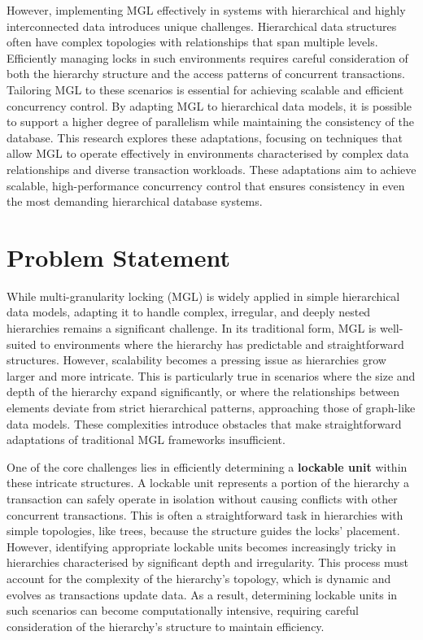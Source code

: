 However, implementing MGL effectively in systems with hierarchical and highly interconnected data introduces unique challenges. Hierarchical data structures often have complex topologies with relationships that span multiple levels. Efficiently managing locks in such environments requires careful consideration of both the hierarchy structure and the access patterns of concurrent transactions. Tailoring MGL to these scenarios is essential for achieving scalable and efficient concurrency control. By adapting MGL to hierarchical data models, it is possible to support a higher degree of parallelism while maintaining the consistency of the database. This research explores these adaptations, focusing on techniques that allow MGL to operate effectively in environments characterised by complex data relationships and diverse transaction workloads. These adaptations aim to achieve scalable, high-performance concurrency control that ensures consistency in even the most demanding hierarchical database systems.

\section*{Problem Statement}

While multi-granularity locking (MGL) is widely applied in simple hierarchical data models, adapting it to handle complex, irregular, and deeply nested hierarchies remains a significant challenge. In its traditional form, MGL is well-suited to environments where the hierarchy has predictable and straightforward structures. However, scalability becomes a pressing issue as hierarchies grow larger and more intricate. This is particularly true in scenarios where the size and depth of the hierarchy expand significantly, or where the relationships between elements deviate from strict hierarchical patterns, approaching those of graph-like data models. These complexities introduce obstacles that make straightforward adaptations of traditional MGL frameworks insufficient.

One of the core challenges lies in efficiently determining a \textbf{lockable unit} within these intricate structures. A lockable unit represents a portion of the hierarchy a transaction can safely operate in isolation without causing conflicts with other concurrent transactions. This is often a straightforward task in hierarchies with simple topologies, like trees, because the structure guides the locks' placement. However, identifying appropriate lockable units becomes increasingly tricky in hierarchies characterised by significant depth and irregularity. This process must account for the complexity of the hierarchy's topology, which is dynamic and evolves as transactions update data. As a result, determining lockable units in such scenarios can become computationally intensive, requiring careful consideration of the hierarchy's structure to maintain efficiency.

